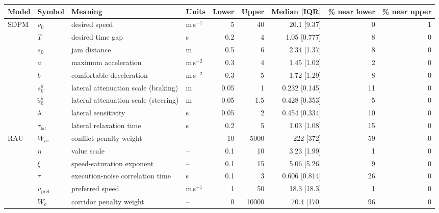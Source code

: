 \begin{tabular}{llllrrrrr}
\toprule
Model & Symbol & Meaning & Units & Lower & Upper & Median [IQR] & \% near lower & \% near upper \\
\midrule
SDPM & $v_0$ & desired speed & m\,s$^{-1}$ & 5 & 40 & 20.1 [9.37] & 0 & 1 \\
 & $T$ & desired time gap & s & 0.2 & 4 & 1.05 [0.777] & 8 & 0 \\
 & $s_0$ & jam distance & m & 0.5 & 6 & 2.34 [1.37] & 8 & 0 \\
 & $a$ & maximum acceleration & m\,s$^{-2}$ & 0.3 & 4 & 1.45 [1.02] & 2 & 0 \\
 & $b$ & comfortable deceleration & m\,s$^{-2}$ & 0.3 & 5 & 1.72 [1.29] & 8 & 0 \\
 & $s_0^y$ & lateral attenuation scale (braking) & m & 0.05 & 1 & 0.232 [0.145] & 11 & 0 \\
 & $\tilde s_0^y$ & lateral attenuation scale (steering) & m & 0.05 & 1.5 & 0.428 [0.353] & 5 & 0 \\
 & $\lambda$ & lateral sensitivity & s & 0.05 & 2 & 0.454 [0.334] & 10 & 0 \\
 & $\tau_{\mathrm{lat}}$ & lateral relaxation time & s & 0.2 & 5 & 1.03 [1.08] & 15 & 0 \\
\midrule
RAU & $W_{cc}$ & conflict penalty weight & -- & 10 & 5000 & 222 [372] & 59 & 0 \\
 & $\eta$ & value scale & -- & 0.1 & 10 & 3.23 [1.99] & 1 & 0 \\
 & $\xi$ & speed-saturation exponent & -- & 0.1 & 15 & 5.06 [5.26] & 9 & 0 \\
 & $\tau$ & execution-noise correlation time & s & 0.1 & 3 & 0.606 [0.814] & 26 & 0 \\
 & $v_{\mathrm{pref}}$ & preferred speed & m\,s$^{-1}$ & 1 & 50 & 18.3 [18.3] & 1 & 0 \\
 & $W_b$ & corridor penalty weight & -- & 0 & 10000 & 70.4 [170] & 96 & 0 \\
\bottomrule
\end{tabular}
